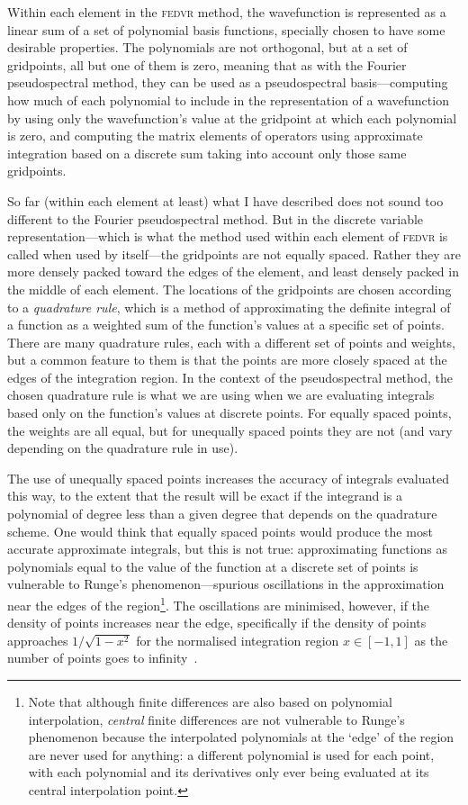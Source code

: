 Within each element in the \textsc{fedvr} method, the wavefunction is represented as a linear sum of a set of polynomial basis functions, specially chosen to have some desirable properties. The polynomials are not orthogonal, but at a set of gridpoints, all but one of them is zero, meaning that as with the Fourier pseudospectral method, they can be used as a pseudospectral basis---computing how much of each polynomial to include in the representation of a wavefunction by using only the wavefunction's value at the gridpoint at which each polynomial is zero, and computing the matrix elements of operators using approximate integration based on a discrete sum taking into account only those same gridpoints.

So far (within each element at least) what I have described does not sound too different to the Fourier pseudospectral method. But in the discrete variable representation---which is what the method used within each element of \textsc{fedvr} is called when used by itself---the gridpoints are not equally spaced. Rather they are more densely packed toward the edges of the element, and least densely packed in the middle of each element. The locations of the gridpoints are chosen according to a \emph{quadrature rule}, which is a method of approximating the definite integral of a function as a  weighted sum of the function's values at a specific set of points. There are many quadrature rules, each with a different set of points and weights, but a common feature to them is that the points are more closely spaced at the edges of the integration region. In the context of the pseudospectral method, the chosen quadrature rule is what we are using when we are evaluating integrals based only on the function's values at discrete points. For equally spaced points, the weights are all equal, but for unequally spaced points they are not (and vary depending on the quadrature rule in use).

The use of unequally spaced points increases the accuracy of integrals evaluated this way, to the extent that the result will be exact if the integrand is a polynomial of degree less than a given degree that depends on the quadrature scheme. One would think that equally spaced points would produce the most accurate approximate integrals, but this is not true: approximating functions as polynomials equal to the value of the function at a discrete set of points is vulnerable to Runge's phenomenon---spurious oscillations in the approximation near the edges of the region\footnote{Note that although finite differences are also based on polynomial interpolation, \emph{central} finite differences are not vulnerable to Runge's phenomenon because the interpolated polynomials at the `edge' of the region are never used for anything: a different polynomial is used for each point, with each polynomial and its derivatives only ever being evaluated at its central interpolation point.}. The oscillations are minimised, however, if the density of points increases near the edge, specifically if the density of points approaches $1/\sqrt{1 - x^2}$ for the normalised integration region $x \in [-1, 1]$ as the number of points goes to infinity~\cite{berrut_barycentric_2004}. 

